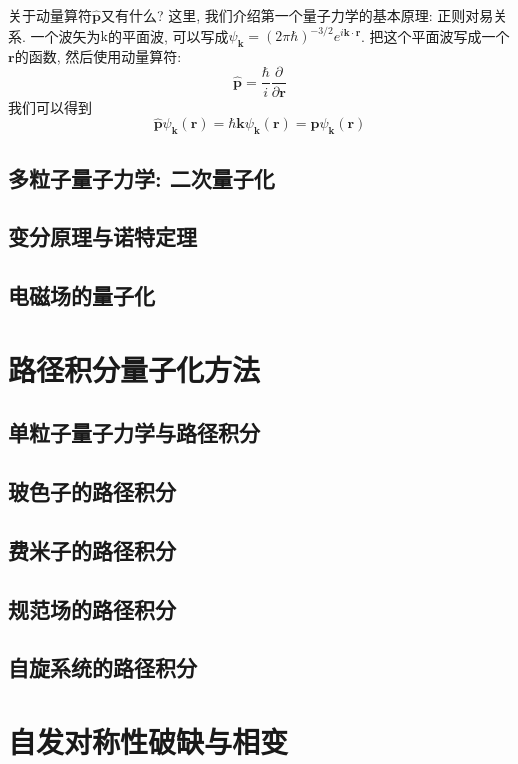\documentclass[b5paper]{book}
\begin{document}
关于动量算符$\hat{\mathbf{p}}$又有什么? 这里, 我们介绍第一个量子力学的基本原理: 正则对易关系. 一个波矢为$\mathrm{k}$的平面波, 可以写成$\psi_\mathbf{k}=(2\pi\hbar)^{-3/2}e^{i\mathbf{k}\cdot\mathbf{r}}$. 把这个平面波写成一个$\mathbf{r}$的函数, 然后使用动量算符:
\begin{equation}
\hat{\mathbf{p}}=\frac{\hbar}{i}\frac{\partial}{\partial \mathbf{r}}
\end{equation}
我们可以得到
\begin{equation}
\hat{\mathbf{p}}\psi_\mathbf{k}(\mathbf{r})=\hbar\mathbf{k}\psi_\mathbf{k}(\mathbf{r})=\mathbf{p}\psi_{\mathbf{k}}(\mathbf{r})
\end{equation}


\section{多粒子量子力学: 二次量子化}
\section{变分原理与诺特定理}
\section{电磁场的量子化}

\chapter{路径积分量子化方法}
\section{单粒子量子力学与路径积分}
\section{玻色子的路径积分}
\section{费米子的路径积分}
\section{规范场的路径积分}
\section{自旋系统的路径积分}

\chapter{自发对称性破缺与相变}
\end{document}
